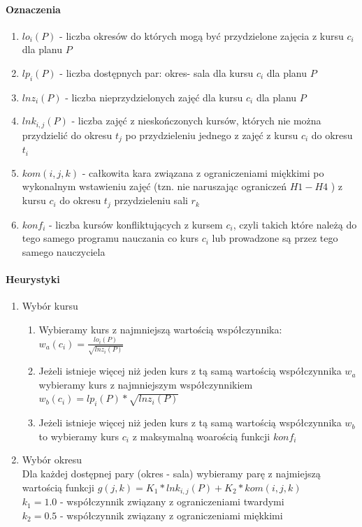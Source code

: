 \paragraph{Oznaczenia}
\begin{enumerate}
\item $ lo_{i}(P)$ - liczba okresów do których mogą być przydzielone zajęcia z kursu $c_{i}$ dla planu ${P}$
\item $ lp_{i}(P)$ - liczba dostępnych par: okres- sala dla kursu ${c_{i}}$ dla planu ${P}$
\item $ lnz_{i}(P)$ - liczba nieprzydzielonych zajęć dla kursu ${c_{i}}$ dla planu ${P}$
\item $ lnk_{i, j}(P)$ - liczba zajęć z nieskończonych kursów, których nie można przydzielić do okresu ${t_{j}}$ po przydzieleniu jednego z zajęć z kursu ${c_{i}}$ do okresu ${t_{i}}$
\item $kom(i, j, k)$ - całkowita kara związana z ograniczeniami miękkimi po wykonalnym wstawieniu zajęć (tzn. nie naruszając ograniczeń $H1 - H4$ ) z kursu $c_{i}$ do okresu ${t_{j}}$ przydzieleniu sali ${r_{k}}$
\item $konf_{i}$ - liczba kursów konfliktujących z kursem $c_{i}$, czyli takich które należą do tego samego programu nauczania co kurs $c_{i}$ lub prowadzone są przez tego samego nauczyciela
\end{enumerate}
\paragraph{Heurystyki}

\begin{enumerate}
  \item Wybór kursu 
  \begin{enumerate}
    \item Wybieramy kurs z najmniejszą wartością współczynnika:\\
     $ w_a(c_{i}) = \frac{lo_{i}(P)}{\sqrt{lnz_{i}(P)}}$
    \item Jeżeli istnieje więcej niż jeden kurs z tą samą wartością współczynnika ${w_a}$ wybieramy kurs z najmniejszym współczynnikiem \\ $ w_b(c_{i}) = lp_{i}(P) * \sqrt{lnz_{i}(P)} $
    \item Jeżeli istnieje więcej niż jeden kurs z tą samą wartością współczynnika $w_b$ to wybieramy kurs ${c_{i}}$ z maksymalną woarością funkcji $konf_{i}$
 
  \end{enumerate}
  \item Wybór okresu \\
  Dla każdej dostępnej pary (okres - sala) wybieramy parę z najmiejszą wartością funkcji $g(j, k) = K_{1} * lnk_{i,j}(P) + K_{2} * kom(i, j, k)$ \\
  $k_{1} = 1.0 $ - współczynnik związany z ograniczeniami twardymi \\
  $k_{2} = 0.5 $ - współczynnik związany z ograniczeniami miękkimi
\end{enumerate}



